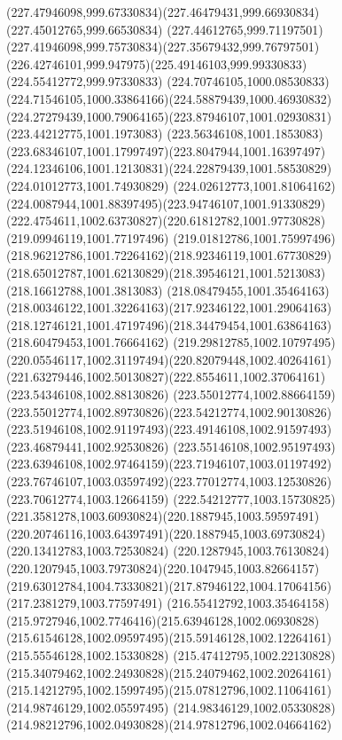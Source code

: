 {    \curveto(227.47946098,999.67330834)(227.46479431,999.66930834)(227.45012765,999.66530834)
    \curveto(227.44612765,999.71197501)(227.41946098,999.75730834)(227.35679432,999.76797501)
    \curveto(226.42746101,999.947975)(225.49146103,999.99330833)(224.55412772,999.97330833)
    \curveto(224.70746105,1000.08530833)(224.71546105,1000.33864166)(224.58879439,1000.46930832)
    \curveto(224.27279439,1000.79064165)(223.87946107,1001.02930831)(223.44212775,1001.1973083)
    \curveto(223.56346108,1001.1853083)(223.68346107,1001.17997497)(223.8047944,1001.16397497)
    \curveto(224.12346106,1001.12130831)(224.22879439,1001.58530829)(224.01012773,1001.74930829)
    \curveto(224.02612773,1001.81064162)(224.0087944,1001.88397495)(223.94746107,1001.91330829)
    \curveto(222.4754611,1002.63730827)(220.61812782,1001.97730828)(219.09946119,1001.77197496)
    \curveto(219.01812786,1001.75997496)(218.96212786,1001.72264162)(218.92346119,1001.67730829)
    \curveto(218.65012787,1001.62130829)(218.39546121,1001.5213083)(218.16612788,1001.3813083)
    \curveto(218.08479455,1001.35464163)(218.00346122,1001.32264163)(217.92346122,1001.29064163)
    \curveto(218.12746121,1001.47197496)(218.34479454,1001.63864163)(218.60479453,1001.76664162)
    \curveto(219.29812785,1002.10797495)(220.05546117,1002.31197494)(220.82079448,1002.40264161)
    \curveto(221.63279446,1002.50130827)(222.8554611,1002.37064161)(223.54346108,1002.88130826)
    \curveto(223.55012774,1002.88664159)(223.55012774,1002.89730826)(223.54212774,1002.90130826)
    \curveto(223.51946108,1002.91197493)(223.49146108,1002.91597493)(223.46879441,1002.92530826)
    \curveto(223.55146108,1002.95197493)(223.63946108,1002.97464159)(223.71946107,1003.01197492)
    \curveto(223.76746107,1003.03597492)(223.77012774,1003.12530826)(223.70612774,1003.12664159)
    \curveto(222.54212777,1003.15730825)(221.3581278,1003.60930824)(220.1887945,1003.59597491)
    \curveto(220.20746116,1003.64397491)(220.1887945,1003.69730824)(220.13412783,1003.72530824)
    \curveto(220.1287945,1003.76130824)(220.1207945,1003.79730824)(220.1047945,1003.82664157)
    \curveto(219.63012784,1004.73330821)(217.87946122,1004.17064156)(217.2381279,1003.77597491)
    \curveto(216.55412792,1003.35464158)(215.9727946,1002.7746416)(215.63946128,1002.06930828)
    \curveto(215.61546128,1002.09597495)(215.59146128,1002.12264161)(215.55546128,1002.15330828)
    \curveto(215.47412795,1002.22130828)(215.34079462,1002.24930828)(215.24079462,1002.20264161)
    \curveto(215.14212795,1002.15997495)(215.07812796,1002.11064161)(214.98746129,1002.05597495)
    \curveto(214.98346129,1002.05330828)(214.98212796,1002.04930828)(214.97812796,1002.04664162)
}
